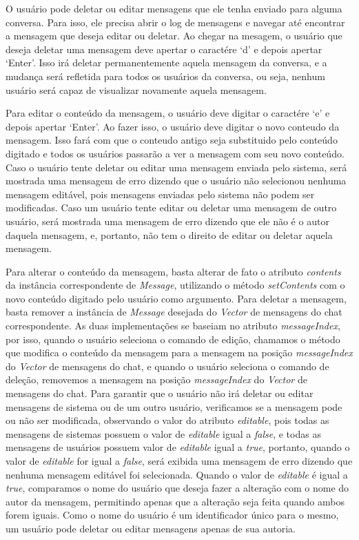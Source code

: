 \documentclass[../main.tex]{subfiles}
\begin{document}
O usuário pode deletar ou editar mensagens que ele tenha enviado para alguma conversa.
Para isso, ele precisa abrir o log de mensagens e navegar até encontrar a mensagem que deseja editar ou deletar.
Ao chegar na mesagem, o usuário que deseja deletar uma mensagem deve apertar o caractére `d' e depois apertar `Enter'.
Isso irá deletar permanentemente aquela mensagem da conversa, e a mudança será refletida para todos os usuários da conversa, ou seja, nenhum usuário será capaz de visualizar novamente aquela mensagem.

Para editar o conteúdo da mensagem, o usuário deve digitar o caractére `e' e depois apertar `Enter'.
Ao fazer isso, o usuário deve digitar o novo conteudo da mensagem.
Isso fará com que o conteudo antigo seja substituido pelo conteúdo digitado e todos os usuários passarão a ver a mensagem com seu novo conteúdo.
Caso o usuário tente deletar ou editar uma mensagem enviada pelo sistema, será mostrada uma mensagem de erro dizendo que o usuário não selecionou nenhuma mensagem editável, pois mensagens enviadas pelo sistema não podem ser modificadas.
Caso um usuário tente editar ou deletar uma mensagem de outro usuário, será mostrada uma mensagem de erro dizendo que ele não é o autor daquela mensagem, e, portanto, não tem o direito de editar ou deletar aquela mensagem.

Para alterar o conteúdo da mensagem, basta alterar de fato o atributo \textit{contents} da instância correspondente de \textit{Message}, utilizando o método \textit{setContents} com o novo conteúdo digitado pelo usuário como argumento.
Para deletar a mensagem, basta remover a instância de \textit{Message} desejada do \textit{Vector} de mensagens do chat correspondente.
As duas implementações se baseiam no atributo \textit{messageIndex}, por isso, quando o usuário seleciona o comando de edição, chamamos o método que modifica o conteúdo da mensagem para a mensagem na posição \textit{messageIndex} do \textit{Vector} de mensagens do chat, e quando o usuário seleciona o comando de deleção, removemos a mensagem na posição \textit{messageIndex} do \textit{Vector} de mensagens do chat.
Para garantir que o usuário não irá deletar ou editar mensagens de sistema ou de um outro usuário, verificamos se a mensagem pode ou não ser modificada, observando o valor do atributo \textit{editable}, pois todas as mensagens de sistemas possuem o valor de \textit{editable} igual a \textit{false}, e todas as mensagens de usuários possuem valor de \textit{editable} igual a \textit{true}, portanto, quando o valor de \textit{editable} for igual a \textit{false}, será exibida uma mensagem de erro dizendo que nenhuma mensagem editável foi selecionada. Quando o valor de \textit{editable} é igual a \textit{true}, comparamos o nome do usuário que deseja fazer a alteração com o nome do autor da mensagem, permitindo apenas que a alteração seja feita quando ambos forem iguais.
Como o nome do usuário é um identificador único para o mesmo, um usuário pode deletar ou editar mensagens apenas de sua autoria.
\end{document}
